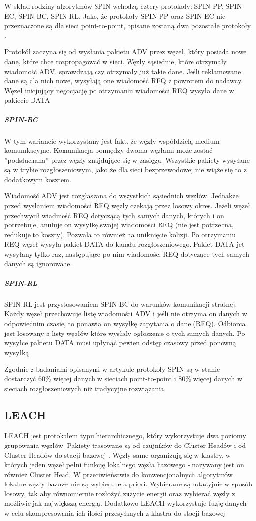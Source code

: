 W skład rodziny algorytmów SPIN wchodzą cztery protokoły: SPIN-PP, SPIN-EC, SPIN-BC, SPIN-RL. Jako, że protokoły SPIN-PP oraz SPIN-EC nie przeznaczone są dla sieci point-to-point, opisane zostaną dwa pozostałe protokoły \cite{Dargie2010, Kulik2002}.

Protokół zaczyna się od wysłania pakietu ADV przez węzeł, który posiada nowe dane, które chce rozpropagować w sieci. Węzły sąsiednie, które otrzymały wiadomość ADV, sprawdzają czy otrzymały już takie dane. Jeśli reklamowane dane są dla nich nowe, wysyłają one wiadomość REQ z powrotem do nadawcy. Węzeł inicjujący negocjację po otrzymaniu wiadomości REQ wysyła dane w pakiecie DATA

\subparagraph{SPIN-BC}
W tym wariancie wykorzystany jest fakt, że węzły współdzielą medium komunikacyjne. Komunikacja pomiędzy dwoma węzłami może zostać ''podsłuchana'' przez węzły znajdujące się w zasięgu. Wszystkie pakiety wysyłane są w trybie rozgłoszeniowym, jako że dla sieci bezprzewodowej nie wiąże się to z dodatkowym kosztem.

Wiadomość ADV jest rozgłaszana do wszystkich sąsiednich węzłów. Jednakże przed wysłaniem wiadomości REQ węzły czekają przez losowy okres. Jeżeli węzeł przechwycił wiadmość REQ dotyczącą tych samych danych, których i on potrzebuje, anuluje on wysyłkę swojej wiadomości REQ (nie jest potrzebna, redukuje to koszty). Pozwala to również na uniknięcie kolizji. Po otrzymaniu REQ węzeł wysyła pakiet DATA do kanału rozgłoszeniowego. Pakiet DATA jet wysyłany tylko raz, następujące po nim wiadomości REQ dotyczące tych samych danych są ignorowane.
\subparagraph{SPIN-RL}
SPIN-RL jest przystosowaniem SPIN-BC do warunków komunikacji stratnej. Każdy węzeł przechowuje listę wiadomości ADV i jeśli nie otrzyma on danych w odpowiednim czasie, to ponawia on wysyłkę zapytania o dane (REQ). Odbiorca jest losowany z listy węzłów które wysłały ogłoszenie o tych samych danych.
Po wysyłce pakietu DATA musi upłynąć pewien odstęp czasowy przed ponowną wysyłką.

Zgodnie z badaniami opisanymi w artykule \cite{Kulik2002} protokoły SPIN są w stanie dostarczyć 60\% więcej danych w sieciach point-to-point i 80\% więcej danych w sieciach rozgłoszeniowych niż tradycyjne rozwiązania.  
\subsection{LEACH} \label{subsec:leach}
LEACH jest protokołem typu hierarchicznego, który wykorzystuje dwa poziomy grupowania węzłów. Pakiety trasowane są od czujników do Cluster Headów i od Cluster Headów do stacji bazowej \cite{Yu2006}.
Węzły same organizują się w klastry, w których jeden węzeł pełni funkcję lokalnego węzła bazowego - nazywany jest on również Cluster Head. W przeciwieństwie do konwencjonalnych algorytmów lokalne węzły bazowe nie są wybierane a priori. Wybierane są rotacyjnie w sposób losowy, tak aby równomiernie rozłożyć zużycie energii oraz wybierać węzły z możliwie jak największą energią. Dodatkowo LEACH wykorzystuje fuzję danych w celu skompresowania ich ilości przesyłanych z klastra do stacji bazowej \cite{Akkaya2005}%

